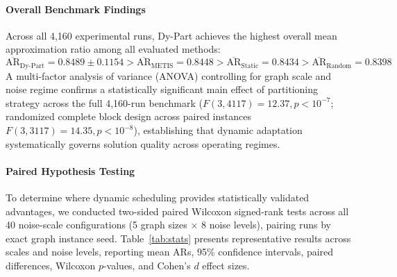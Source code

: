 \documentclass[pdflatex,sn-mathphys-num]{sn-jnl}
\theoremstyle{thmstyleone}
\theoremstyle{thmstyletwo}%
\theoremstyle{thmstylethree}%
\begin{document}
\paragraph{Overall Benchmark Findings} Across all 4,160 experimental runs, Dy-Part achieves the highest overall mean approximation ratio among all evaluated methods:
\begin{equation*}
    \overline{\text{AR}}_{\text{Dy-Part}} = 0.8489 \pm 0.1154 > \overline{\text{AR}}_{\text{METIS}} = 0.8448 > \overline{\text{AR}}_{\text{Static}} = 0.8434 > \overline{\text{AR}}_{\text{Random}} = 0.8398
\end{equation*}
A multi-factor analysis of variance (ANOVA) controlling for graph scale and noise regime confirms a statistically significant main effect of partitioning strategy across the full 4,160-run benchmark ($F(3, 4117) = 12.37, p < 10^{-7}$; randomized complete block design across paired instances $F(3, 3117) = 14.35, p < 10^{-8}$), establishing that dynamic adaptation systematically governs solution quality across operating regimes.

\paragraph{Paired Hypothesis Testing} To determine where dynamic scheduling provides statistically validated advantages, we conducted two-sided paired Wilcoxon signed-rank tests across all 40 noise-scale configurations (5 graph sizes $\times$ 8 noise levels), pairing runs by exact graph instance seed. Table~\ref{tab:stats} presents representative results across scales and noise levels, reporting mean ARs, 95\% confidence intervals, paired differences, Wilcoxon $p$-values, and Cohen's $d$ effect sizes.
\end{document}

